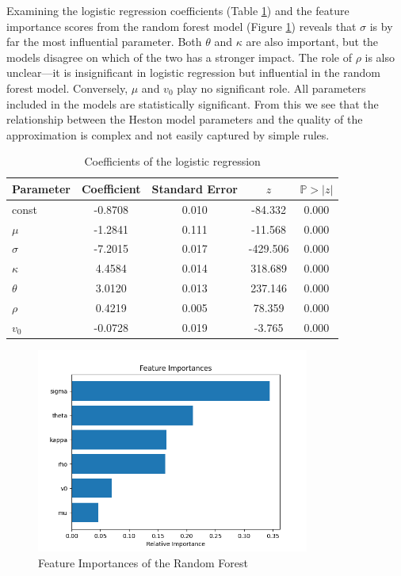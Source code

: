 Examining the logistic regression coefficients (Table \ref{tab:logistic_regression_coefficients}) and the feature importance scores from the random forest model (Figure \ref{fig:feature_importances}) reveals that $\sigma$ is by far the most influential parameter. Both $\theta$ and $\kappa$ are also important, but the models disagree on which of the two has a stronger impact. The role of $\rho$ is also unclear—it is insignificant in logistic regression but influential in the random forest model. Conversely, $\mu$ and $v_0$ play no significant role. All parameters included in the models are statistically significant. From this we see that the relationship between the Heston model parameters and the quality of the approximation is complex and not easily captured by simple rules.

\begin{table}
    \centering
    \begin{tabular}{l|c|c|c|c}
        \textbf{Parameter} & \textbf{Coefficient} & \textbf{Standard Error} & $z$ & $\mathbb{P}>\vert z\vert$ \\
        \hline
        const & -0.8708 & 0.010 & -84.332 & 0.000 \\
        $\mu$ & -1.2841 & 0.111 & -11.568 & 0.000 \\
        $\sigma$ & -7.2015 & 0.017 & -429.506 & 0.000 \\
        $\kappa$ & 4.4584 & 0.014 & 318.689 & 0.000 \\
        $\theta$ & 3.0120 & 0.013 & 237.146 & 0.000 \\
        $\rho$ & 0.4219 & 0.005 & 78.359 & 0.000 \\
        $v_0$ & -0.0728 & 0.019 & -3.765 & 0.000
    \end{tabular}
    \caption{Coefficients of the logistic regression}
    \label{tab:logistic_regression_coefficients}
\end{table}

\begin{figure}
    \centering
    \includegraphics[width=0.8\textwidth]{img/feature_importances.png}
    \caption{Feature Importances of the Random Forest}
    \label{fig:feature_importances}
\end{figure}

